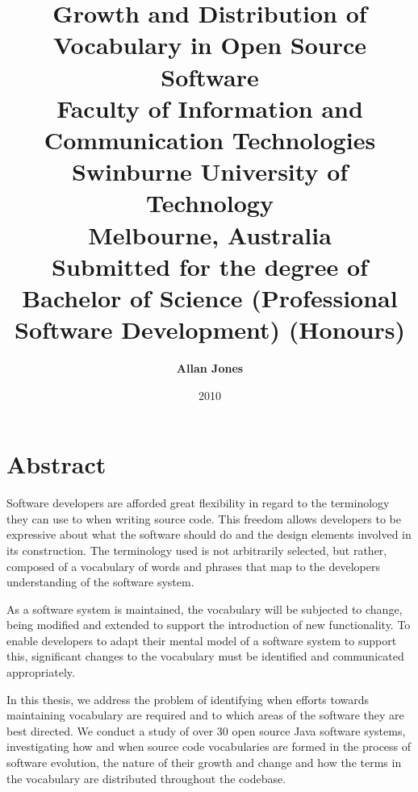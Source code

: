 \title{ \huge{\textbf{Growth and Distribution of Vocabulary in Open Source Software}} \\[1.2cm]
\large{Faculty of Information and Communication Technologies\\
Swinburne University of Technology\\
Melbourne, Australia\\}
\vspace{1.2cm} 
\large{Submitted for the degree of Bachelor of Science (Professional Software Development) (Honours)} \\
\vspace{1cm} 
} 
\author{ \Large{\textbf{Allan Jones}} } 
\date{2010} 
\maketitle

\newpage 
{}
\chapter*{Abstract}
\vspace{-0.75cm}

Software developers are afforded great flexibility in regard to the terminology they can use to when writing source code. This freedom allows developers to be expressive about what the software should do and the design elements involved in its construction. The terminology used is not arbitrarily selected, but rather, composed of a vocabulary of words and phrases that map to the developers understanding of the software system.

As a software system is maintained, the vocabulary will be subjected to change, being modified and extended to support the introduction of new functionality. To enable developers to adapt their mental model of a software system to support this, significant changes to the vocabulary must be identified and communicated appropriately.

In this thesis, we address the problem of identifying when efforts towards maintaining vocabulary are required and to which areas of the software they are best directed. We conduct a study of over 30 open source Java software systems, investigating how and when source code vocabularies are formed in the process of software evolution, the nature of their growth and change and how the terms in the vocabulary are distributed throughout the codebase.

